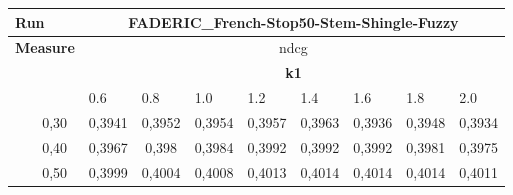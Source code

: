 \begin{table}[!h]
\begin{tabular}{|cc|cccccccc|}
\toprule
\multicolumn{2}{|l|}{\textbf{Run}} & \multicolumn{8}{c|}{FADERIC\_French-Stop50-Stem-Shingle-Fuzzy}\\
\midrule
\multicolumn{2}{|l|}{\textbf{Measure}} & \multicolumn{8}{c|}{ndcg}\\
\midrule
& \multicolumn{1}{l|}{}    & \multicolumn{8}{c|}{\textbf{k1}}\\
\cmidrule{3-10}
 & \multicolumn{1}{l|}{}  & \multicolumn{1}{l|}{0.6} & \multicolumn{1}{l|}{0.8} & \multicolumn{1}{l|}{1.0} & \multicolumn{1}{l|}{1.2} & \multicolumn{1}{l|}{1.4} & \multicolumn{1}{l|}{1.6} & \multicolumn{1}{l|}{1.8}   & \multicolumn{1}{l|}{2.0} \\
\midrule
\multicolumn{1}{|c|}{}                             & 0,30                      & \multicolumn{1}{c|}{\cellcolor[HTML]{E27066}0,3941} & \multicolumn{1}{c|}{\cellcolor[HTML]{E67F66}0,3952} & \multicolumn{1}{r|}{\cellcolor[HTML]{E78266}0,3954} & \multicolumn{1}{c|}{\cellcolor[HTML]{E88766}0,3957} & \multicolumn{1}{c|}{\cellcolor[HTML]{EB8F66}0,3963} & \multicolumn{1}{c|}{\cellcolor[HTML]{E06866}0,3936}          & \multicolumn{1}{c|}{\cellcolor[HTML]{E57A66}0,3948}          & \cellcolor[HTML]{E06666}0,3934 \\ %
\multicolumn{1}{|c|}{}                             & 0,40                      & \multicolumn{1}{c|}{\cellcolor[HTML]{EC9566}0,3967} & \multicolumn{1}{c|}{\cellcolor[HTML]{F1A866}0,398}  & \multicolumn{1}{c|}{\cellcolor[HTML]{F3AD66}0,3984} & \multicolumn{1}{c|}{\cellcolor[HTML]{F6B966}0,3992} & \multicolumn{1}{c|}{\cellcolor[HTML]{F6B966}0,3992} & \multicolumn{1}{c|}{\cellcolor[HTML]{F6B966}0,3992}          & \multicolumn{1}{c|}{\cellcolor[HTML]{F2A966}0,3981}          & \cellcolor[HTML]{EFA066}0,3975 \\ %
\multicolumn{1}{|c|}{}                             & 0,50                      & \multicolumn{1}{c|}{\cellcolor[HTML]{F9C366}0,3999} & \multicolumn{1}{c|}{\cellcolor[HTML]{FBCA66}0,4004} & \multicolumn{1}{c|}{\cellcolor[HTML]{FCD066}0,4008} & \multicolumn{1}{c|}{\cellcolor[HTML]{FED766}0,4013} & \multicolumn{1}{c|}{\cellcolor[HTML]{FFD966}0,4014} & \multicolumn{1}{c|}{\cellcolor[HTML]{FFD966}0,4014}          & \multicolumn{1}{c|}{\cellcolor[HTML]{FFD966}0,4014}          & \cellcolor[HTML]{FDD466}0,4011 \\ %

\end{tabular}
\end{table}
